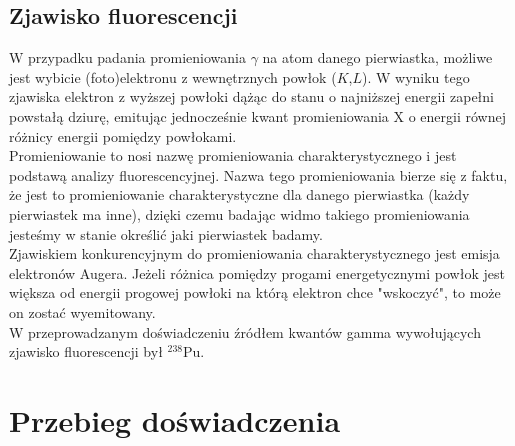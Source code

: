 \documentclass{article}
\begin{document}
\subsection{Zjawisko fluorescencji}
W przypadku padania promieniowania $\gamma$ na atom danego pierwiastka, możliwe jest wybicie (foto)elektronu z wewnętrznych powłok ($K$,$L$). W wyniku tego zjawiska elektron z wyższej powłoki dążąc do stanu o najniższej energii zapełni powstałą dziurę, emitując jednocześnie kwant promieniowania X o energii równej różnicy energii pomiędzy powłokami.\\
 Promieniowanie to nosi nazwę promieniowania charakterystycznego i jest podstawą analizy fluorescencyjnej. Nazwa tego promieniowania bierze się z faktu, że jest to promieniowanie charakterystyczne dla danego pierwiastka (każdy pierwiastek ma inne), dzięki czemu badając widmo takiego promieniowania jesteśmy w stanie określić jaki pierwiastek badamy.\\
 Zjawiskiem konkurencyjnym do promieniowania charakterystycznego jest emisja elektronów Augera. Jeżeli różnica pomiędzy progami energetycznymi powłok jest większa od energii progowej powłoki na którą elektron chce "wskoczyć", to może on zostać wyemitowany.\\
 W przeprowadzanym doświadczeniu źródłem kwantów gamma wywołujących zjawisko fluorescencji był $^{238}$Pu.
 
 \section{Przebieg doświadczenia}
 
\end{document}
